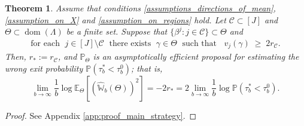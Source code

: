\documentclass[aap,preprint]{imsart}
\newcommand{\Pro}{{\mathbb{P}}}
\newcommand{\Exp}{{\mathbb{E}}}
\theoremstyle{plain}
\newtheorem{theorem}{Theorem}[section]
\newtheorem{remark}{Remark}[section]
\theoremstyle{definition}
\begin{document}

\begin{theorem}\label{thm:main_strategy}
Assume that conditions \eqref{assumptions_directions_of_mean}, \eqref{assumption_on_X} and \eqref{assumption_on_regions} hold. Let $\mathcal{C} \subset [J]$ and $\Theta  \subset \operatorname{dom}(\Lambda)$ be a finite set. %
Suppose that $\{\beta^j : j \in \mathcal{C}\} \subset \Theta$  and 
\begin{align}\label{def:key_condition}
\text{for each } \; j \in [J] \setminus \mathcal{C} \; \text{ there exists }  \; \gamma \in \Theta \; \text{ such that } \;\;
v_j(\gamma) 
\;\geq\; 2r_\mathcal{C}.
\end{align}
Then,  $r_* := r_{\mathcal{C}}$,
and  $\Pro_{\Theta}$ is an asymptotically efficient proposal for estimating the wrong exit probability $\Pro(\tau_b^* < \tau_b^0)$; that is,
\[
\lim_{b \to \infty} \frac{1}{b} \log \Exp_{\Theta}\left[ \left(\widehat{\mathbb{W}}_{b}(\Theta) \right)^2 \right] 
= -2 r_{*} = 2  \lim_{b \to \infty} \frac{1}{b} \log \Pro(\tau_b^* < \tau_b^0).
\]
\end{theorem}
\begin{proof}
    See Appendix \ref{app:proof_main_strategy}.
\end{proof}
\end{document}
